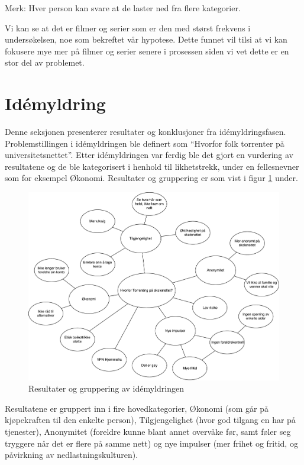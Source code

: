 Merk: Hver person kan svare at de laster ned fra flere kategorier.

\noindent Vi kan se at det er filmer og serier som er den med størst frekvens i undersøkelsen, noe som bekreftet vår hypotese. Dette funnet vil tilsi at vi kan fokusere mye mer på filmer og serier senere i prosessen siden vi vet dette er en stor del av problemet. 

\section{Idémyldring}
Denne seksjonen presenterer resultater og konklusjoner fra idémyldringsfasen. 
Problemstillingen i idémyldringen ble definert som ``Hvorfor folk torrenter på universitetsnettet''. Etter idémyldringen var ferdig ble det gjort en vurdering av resultatene og de ble kategorisert i henhold til likhetstrekk, under en fellesnevner som for eksempel Økonomi. Resultater og gruppering er som vist i figur \ref{fig:case1-idemyldring} under.  

\begin{figure}[H]
    \centering    
    \includegraphics[scale=0.45]{case_1/bilder/idemyldring}
    \caption[Idémyldring av fildeling]{Resultater og gruppering av idémyldringen}
    \label{fig:case1-idemyldring}
\end{figure}

Resultatene er gruppert inn i fire hovedkategorier, Økonomi (som går på kjøpekraften til den enkelte person), Tilgjengelighet (hvor god tilgang en har på tjenester), Anonymitet (foreldre kunne blant annet overvåke før, samt føler seg tryggere når det er flere på samme nett) og nye impulser (mer frihet og fritid, og påvirkning av nedlastningskulturen).

